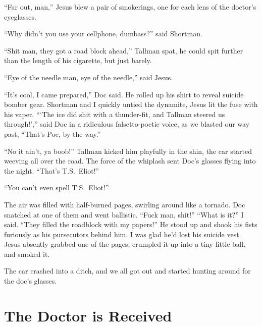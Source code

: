 \documentclass[oneside]{book}
\begin{document}
``Far out, man,'' Jesus blew a pair of smokerings, one for each lens of the doctor's
eyeglasses.

``Why didn't you use your cellphone, dumbass?'' said Shortman.


``Shit man, they got a road block ahead,'' Tallman spat, he could spit further than
the length of his cigarette, but just barely.

``Eye of the needle man, eye of the needle,'' said Jesus.

``It's cool, I came prepared,'' Doc said.  He rolled up his shirt to reveal suicide
bomber gear.  Shortman and I quickly untied the dynamite, Jesus lit the fuse with his
vaper.  ``{`}The ice did shit with a thunder-fit, and Tallman steered us through!{'},''
said Doc in a ridiculous falsetto-poetic voice, as we blasted our way past, ``That's Poe, by the way.''

``No it ain't, ya boob!''  Tallman kicked him playfully in the shin, the car started
weeving all over the road.  The force of the whiplash sent Doc's glasses flying into the night.
``That's T.S.~Eliot!''

``You can't even spell T.S.~Eliot!''

The air was filled with half-burned pages, swirling around like a tornado.  Doc snatched
at one of them and went ballistic.  ``Fuck man, shit!''  ``What is it?'' I said.  ``They
filled the roadblock with my papers!''  He stood up and shook his fists furiously as his
pursecutors behind him.  I was glad he'd lost his suicide vest.
Jesus absently grabbed one of the pages, crumpled it up into
a tiny little ball, and smoked it.

The car crashed into a ditch, and we all got out and started hunting around for the doc's
glasses.


\chapter{The Doctor is Received}
\end{document}
